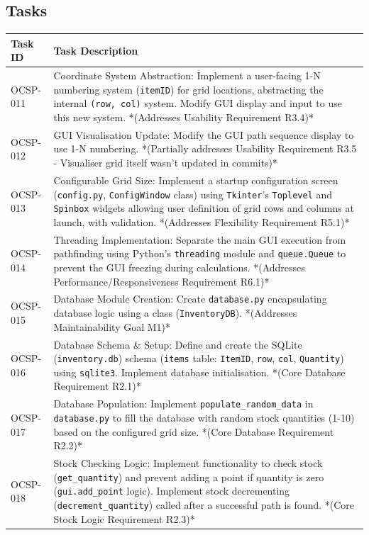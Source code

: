 \subsection{Tasks}

\begin{table}[htbp]
	\centering
	\begin{tabularx}{\textwidth}{|l|X|}
		\hline
		\textbf{Task ID} & \textbf{Task Description} \\
		\hline
		OCSP-011 & Coordinate System Abstraction: Implement a user-facing 1-N numbering system (\verb|itemID|) for grid locations, abstracting the internal \verb|(row, col)| system. Modify GUI display and input to use this new system. *(Addresses Usability Requirement R3.4)* \\
		\hline
		OCSP-012 & GUI Visualisation Update: Modify the GUI path sequence display to use 1-N numbering. *(Partially addresses Usability Requirement R3.5 - Visualiser grid itself wasn't updated in commits)* \\
		\hline
		OCSP-013 & Configurable Grid Size: Implement a startup configuration screen (\verb|config.py|, \verb|ConfigWindow| class) using \verb|Tkinter|'s \verb|Toplevel| and \verb|Spinbox| widgets allowing user definition of grid rows and columns at launch, with validation. *(Addresses Flexibility Requirement R5.1)* \\
		\hline
		OCSP-014 & Threading Implementation: Separate the main GUI execution from pathfinding using Python's \verb|threading| module and \verb|queue.Queue| to prevent the GUI freezing during calculations. *(Addresses Performance/Responsiveness Requirement R6.1)* \\
		\hline
		OCSP-015 & Database Module Creation: Create \verb|database.py| encapsulating database logic using a class (\verb|InventoryDB|). *(Addresses Maintainability Goal M1)* \\
		\hline
		OCSP-016 & Database Schema \& Setup: Define and create the SQLite (\verb|inventory.db|) schema (\verb|items| table: \verb|ItemID|, \verb|row|, \verb|col|, \verb|Quantity|) using \verb|sqlite3|. Implement database initialisation. *(Core Database Requirement R2.1)* \\
		\hline
		OCSP-017 & Database Population: Implement \verb|populate_random_data| in \verb|database.py| to fill the database with random stock quantities (1-10) based on the configured grid size. *(Core Database Requirement R2.2)* \\
		\hline
		OCSP-018 & Stock Checking Logic: Implement functionality to check stock (\verb|get_quantity|) and prevent adding a point if quantity is zero (\verb|gui.add_point| logic). Implement stock decrementing (\verb|decrement_quantity|) called after a successful path is found. *(Core Stock Logic Requirement R2.3)* \\

\end{tabularx}
\end{table}
